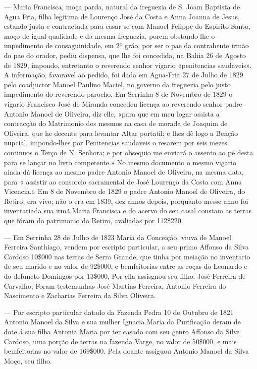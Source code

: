 — Maria Francisca, moça parda, natural da freguezia de S. Joam Baptista de Agua Fria, filha legitima de Lourenço José da Costa e Anna Joanna de Jesus, estando justa e contractada para casar-se com Manoel Felippe do Espirito Santo, moço de igual qualidade e da mesma freguezia, porem obstando-lhe o impedimento de consaguinidade, em 2º gráo, por ser o pae da contrahente irmão do pae do orador, pediu dispensa, que lhe foi concedida, na Bahia 26 de Agosto de 1829, impondo, entretanto o reverendo senhor vigario «penitencias saudaveis». A informação, favoravel ao pedido, foi dada em Agua-Fria 27 de Julho de 1829 pelo coadjuctor Manoel Paulino Maciel, no governo da freguezia pelo justo impedimento do reverendo parocho. Em Serrinha 8 de Novembro de 1829 o vigario Francisco José de Miranda concedeu licença ao reverendo senhor padre Antonio Manoel de Oliveira, diz elle, «para que em meu logar assista a contracção do Matrimonio dos mesmos na casa de morada de Joaquim de Oliveira, que he decente para levantar Altar portatil; e lhes dê logo a Benção nupcial, impondo-lhes por Penitencias saudaveis o resarem por seis mezes continuos o Terço de N. Senhora; e por obsequio me enviará o assento ao pé desta para se lançar no livro competente.» No mesmo documento o mesmo vigario ainda dá licença ao mesmo padre Antonio Manoel de Oliveira, na mesma data, para « assistir ao consorcio sacramental de José Lourenço da Costa com Anna Vicencia.» Em 8 de Novembro de 1829 o padre Antonio Manoel de Oliveira, do Retiro, era vivo; não o era em 1839, dez annos depois, porquanto messe anno foi inventariada sua irmã Maria Francisca e do acervo do seu casal constam as terras que fóram do patrimonio do Retiro, avaliadas por 112\$220.

— Em Serrinha 28 de Julho de 1823 Maria da Conceição, viuva de Manoel Ferreira Santhiago, vendem por escripto particular, a seu primo Affonso da Silva Cardoso 10\$000 nas terras de Serra Grande, que tinha por meiação no inventario de seu marido e no valor de 92\$000, e bemfeitorias entre as roças do Leonardo e do defuncto Domingos por 13\$000, Por ella assisgnou seu filho. José Ferreira de Carvalho, Foram testemunhas José Martins Ferreira, Antonio Ferreira do Nascimento e Zacharias Ferreira da Silva Oliveira.

— Por escripto particular datado da Fazenda Pedra 10 de Outubro de 1821 Antonio Manoel da Silva e sua mulher Ignacia Maria da Purificação deram de dote á sua filha Antonia Maria por ter casado com seu genro Affonso da Silva Cardoso, uma porção de terras na fazenda Varge, no valor de 50\$000, e mais bemfeitorias no valor de 169\$000. Pela doante assiguou Antonio Manoel da Silva Moço, seu filho.

